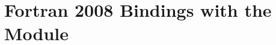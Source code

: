 \section{Fortran 2008 Bindings with the \texorpdfstring{}{mpi\_f08} Module}
\label{sec:lang:fortran-mpi-f08-module}


